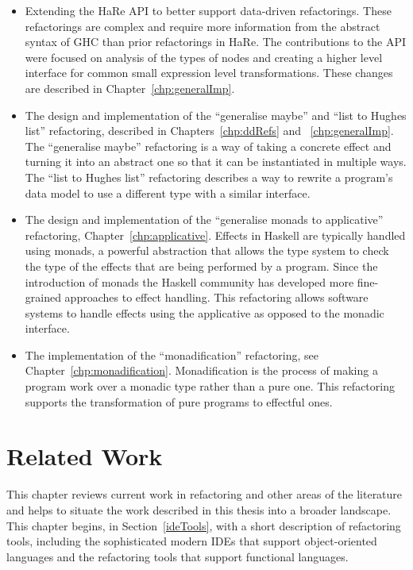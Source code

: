 \begin{itemize}
	\item Extending the HaRe API to better support data-driven refactorings. These refactorings are complex and require more information from the abstract syntax of GHC than prior refactorings in HaRe. The contributions to the API were focused on analysis of the types of nodes and creating a higher level interface for common small expression level transformations. These changes are described in Chapter~\ref{chp:generalImp}.
	\item The design and implementation of the ``generalise maybe'' and ``list to Hughes list'' refactoring, described in Chapters~\ref{chp:ddRefs} and ~\ref{chp:generalImp}. The ``generalise maybe'' refactoring is a way of taking a concrete effect and turning it into an abstract one so that it can be instantiated in multiple ways. The ``list to Hughes list'' refactoring describes a way to rewrite  a program's data model to use a different type with a similar interface.
	\item The design and implementation of the ``generalise monads to applicative'' refactoring, Chapter~\ref{chp:applicative}. Effects in Haskell are typically handled using monads, a powerful abstraction that allows the type system to check the type of the effects that are being performed by a program. Since the introduction of monads the Haskell community has developed more fine-grained approaches to effect handling. This refactoring allows software systems to handle effects using the applicative as opposed to the monadic interface.
	\item The implementation of the ``monadification'' refactoring, see Chapter~\ref{chp:monadification}. Monadification is the process of making a program work over a monadic type rather than a pure one. This refactoring supports the transformation of pure programs to effectful ones.
\end{itemize}




\chapter{Related Work}
\label{chp:related}

This chapter reviews current work in refactoring and other areas of the literature and helps to situate the work described in this thesis into a broader landscape. This chapter begins, in Section~\ref{ideTools}, with a short description of refactoring tools, including the sophisticated modern IDEs that support object-oriented languages and the refactoring tools that support functional languages. 

